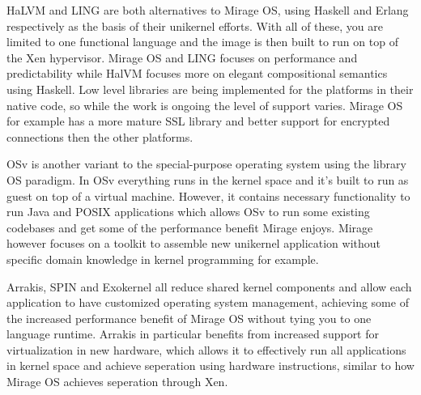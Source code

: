 \documentclass[english,10pt,twocolumn]{article}
\begin{document}
HaLVM\cite{halvm} and LING\cite{ling} are both alternatives to Mirage OS, using Haskell and Erlang respectively as the basis of their unikernel efforts. With all of these, you are limited to one functional language and the image is then built to run on top of the Xen hypervisor. Mirage OS and LING focuses on performance and predictability while HalVM focuses more on elegant compositional semantics using Haskell. Low level libraries are being implemented for the platforms in their native code, so while the work is ongoing the level of support varies. Mirage OS for example has a more mature SSL library and better support for encrypted connections then the other platforms.

OSv\cite{osv} is another variant to the special-purpose operating system using the library OS paradigm. In OSv everything runs in the kernel space and it's built to run as guest on top of a virtual machine. However, it contains necessary functionality to run Java and POSIX applications which allows OSv to run some existing codebases and get some of the performance benefit Mirage enjoys. Mirage however focuses on a toolkit to assemble new unikernel application without specific domain knowledge in kernel programming for example.

Arrakis\cite{arrakis}, SPIN\cite{spin} and Exokernel\cite{exokernel} all reduce shared kernel components and allow each application to have customized operating system management, achieving some of the increased performance benefit of Mirage OS without tying you to one language runtime.  Arrakis in particular benefits from increased support for virtualization in new hardware, which allows it to effectively run all applications in kernel space and achieve seperation using hardware instructions, similar to how Mirage OS achieves seperation through Xen.




\end{document}
